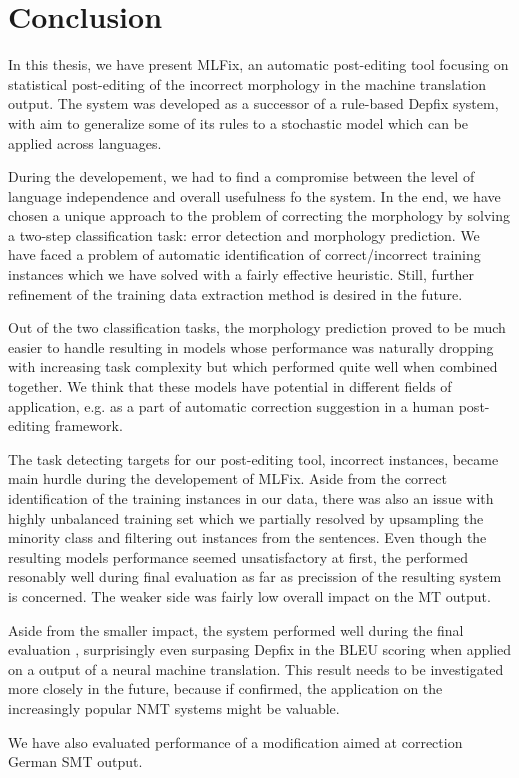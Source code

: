 \chapter{Conclusion}

In this thesis, we have present MLFix, an automatic post-editing tool focusing on statistical
post-editing of the incorrect morphology in the machine translation output. The system was
developed as a successor of a rule-based Depfix system, with aim to generalize some of its
rules to a stochastic model which can be applied across languages.

During the developement, we had to find a compromise between the level of language independence
and overall usefulness fo the system. In the end, we have chosen a unique approach to the problem of correcting
the morphology by solving a two-step classification task: error detection and morphology prediction.
We have faced a problem of automatic identification of correct/incorrect training instances
which we have solved with a fairly effective heuristic. Still, further refinement of the
training data extraction method is desired in the future.

Out of the two classification tasks, the morphology prediction proved to be much easier
to handle resulting in models whose performance was naturally dropping with increasing
task complexity but which performed quite well when combined together. We think that
these models have potential in different fields of application, e.g. as a part of automatic
correction suggestion in a human post-editing framework.

The task detecting targets for our post-editing tool, incorrect instances, became main hurdle
during the developement of MLFix. Aside from the correct identification of the training instances
in our data, there was also an issue with highly unbalanced training set which we partially resolved
by upsampling the minority class and filtering out instances from the  sentences.
Even though the resulting models performance seemed unsatisfactory at first, the performed resonably
well during final evaluation as far as precission of the resulting system is concerned. The weaker
side was fairly low overall impact on the MT output.

Aside from the smaller impact, the system performed well during the final evaluation , surprisingly
even surpasing Depfix in the BLEU scoring when applied on a output of a neural machine translation.
This result needs to be investigated more closely in the future, because if confirmed, the application
on the increasingly popular NMT systems might be valuable.

We have also evaluated performance of a modification aimed at correction German SMT output.
